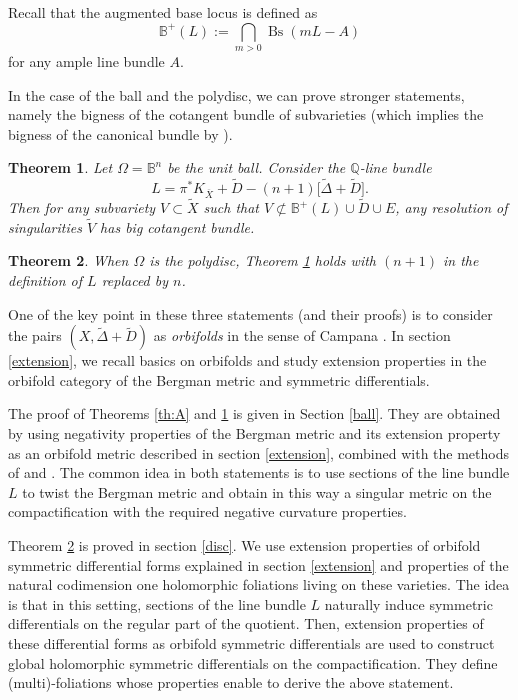 \documentclass[10pt]{amsart}
\theoremstyle{plain}
\newtheorem{thma}{Theorem}
\theoremstyle{definition}
\numberwithin{equation}{theorem}
\DeclareMathOperator{\Bs}{Bs}
\begin{document}
Recall that the augmented base locus is defined as $$\mathbb{B}^+(L):=\bigcap_{m>0} \Bs(mL-A)$$ for any ample line bundle $A$.

In the case of the ball and the polydisc, we can prove stronger statements, namely the bigness of the cotangent bundle of subvarieties (which implies the bigness of the canonical bundle by \cite{CP15}).

\begin{thma} \label{th:B} Let $\Omega = \mathbb B^n$ be the unit ball. Consider the $\mathbb Q$-line bundle
$$
L = \pi^\ast K_{\overline{X}} + \widetilde{D} - (n+1) \bigl [\widetilde{\Delta} + \widetilde{D} \bigr].
$$ Then for any subvariety $V \subset \widetilde{X}$ such that $V \not\subset \mathbb{B}^+ (L) \cup \widetilde{D} \cup E$, any resolution of singularities $\widetilde{V}$ has big cotangent bundle.
\end{thma}

\begin{thma}\label{th:C} When $\Omega$ is the polydisc, Theorem \ref{th:B} holds with $(n+1)$ in the definition of $L$ replaced
by $n$.
\end{thma}

One of the key point in these three statements (and their proofs) is to consider the pairs $(X, \widetilde{\Delta}+\widetilde{D})$ as \emph{orbifolds} in the sense of Campana \cite{Cam04}. In section \ref{extension}, we recall basics on orbifolds and study extension properties in the orbifold category of the Bergman metric and symmetric differentials.

The proof of Theorems \ref{th:A} and \ref{th:B} is given in Section \ref{ball}. They are obtained by using negativity properties of the Bergman metric and its extension property as an orbifold metric described in section \ref{extension}, combined with the methods of \cite{cad16} and \cite{G18}. The common idea in both statements is to use sections of the line bundle $L$ to twist the Bergman metric and obtain in this way a singular metric on the compactification with the required negative curvature properties.

Theorem \ref{th:C} is proved in section \ref{disc}. We use extension properties of orbifold symmetric differential forms explained in section \ref{extension} and properties of the natural codimension one holomorphic foliations living on these varieties. The idea is that in this setting, sections of the line bundle $L$ naturally induce symmetric differentials on the regular part of the quotient. Then, extension properties of these differential forms as orbifold symmetric differentials are used to construct global holomorphic symmetric differentials on the compactification. They define (multi)-foliations whose properties enable to derive the above statement.
\end{document}
